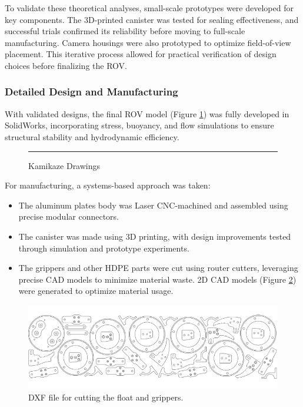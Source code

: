 \hspace{10pt} To validate these theoretical analyses, small-scale prototypes were developed for key components. The 3D-printed canister was tested for sealing effectiveness, and successful trials confirmed its reliability before moving to full-scale manufacturing. Camera housings were also prototyped to optimize field-of-view placement. This iterative process allowed for practical verification of design choices before finalizing the ROV.

\subsubsection{Detailed Design and Manufacturing}

With validated designs, the final ROV model (Figure \ref{fig:kamikaze_drawings}) was fully developed in SolidWorks, incorporating stress, buoyancy, and flow simulations to ensure structural stability and hydrodynamic efficiency.

\begin{figure}[h]
    \centering
    \rule{0.8\columnwidth}{4cm}
    \caption{Kamikaze Drawings}
    \label{fig:kamikaze_drawings}
\end{figure}

For manufacturing, a systems-based approach was taken:

\vspace{-0.5\baselineskip}
\begin{itemize}
    \setlength{\itemsep}{0pt}
    \item The aluminum plates body was Laser CNC-machined and assembled using precise modular connectors.
    \item The canister was made using 3D printing, with design improvements tested through simulation and prototype experiments.
    \item The grippers and other HDPE parts were cut using router cutters, leveraging precise CAD models to minimize material waste. 2D CAD models (Figure \ref{fig:dxf}) were generated to optimize material usage.
\end{itemize}

\begin{figure}[h]
    \centering
    \includegraphics[width=0.8\columnwidth]{Sections/2Design Rationale/images/DXF.png}
    \caption{DXF file for cutting the float and grippers.}
    \label{fig:dxf}
\end{figure}

